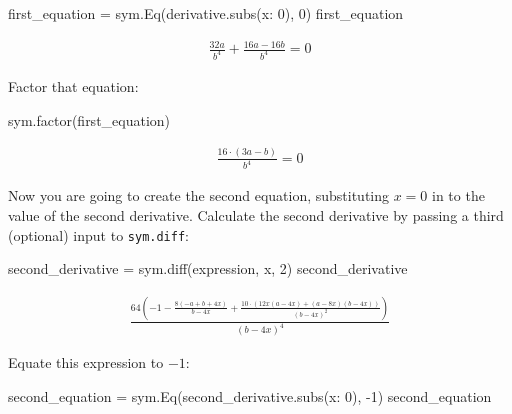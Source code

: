 \begin{pyin}
first_equation = sym.Eq(derivative.subs({x: 0}), 0)
first_equation
\end{pyin}




\begin{equation*}
\begin{split}\displaystyle \frac{32 a}{b^{4}} + \frac{16 a - 16 b}{b^{4}} = 0\end{split}
\end{equation*}




Factor that equation:




\begin{pyin}
sym.factor(first_equation)
\end{pyin}




\begin{equation*}
\begin{split}\displaystyle \frac{16 \cdot \left(3 a - b\right)}{b^{4}} = 0\end{split}
\end{equation*}




Now you are going to create the second equation, substituting \(x=0\) in to the
value of the second derivative. Calculate the second derivative by passing a
third (optional) input to \texttt{sym.diff}:




\begin{pyin}
second_derivative = sym.diff(expression, x, 2)
second_derivative
\end{pyin}




\begin{equation*}
\begin{split}\displaystyle \frac{64 \left(-1 - \frac{8 \left(- a + b + 4 x\right)}{b - 4 x} + \frac{10 \cdot \left(12 x \left(a - 4 x\right) + \left(a - 8 x\right) \left(b - 4 x\right)\right)}{\left(b - 4 x\right)^{2}}\right)}{\left(b - 4 x\right)^{4}}\end{split}
\end{equation*}

Equate this expression to \(-1\):

\begin{pyin}
second_equation = sym.Eq(second_derivative.subs({x: 0}), -1)
second_equation
\end{pyin}




